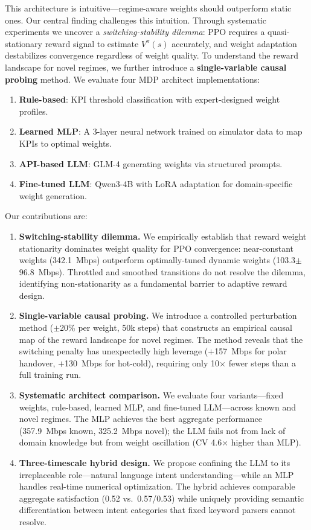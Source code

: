 \documentclass[conference]{IEEEtran}
\begin{document}
This architecture is intuitive---regime-aware weights should outperform static ones. Our central finding challenges this intuition. Through systematic experiments we uncover a \emph{switching-stability dilemma}: PPO requires a quasi-stationary reward signal to estimate $V^\pi(s)$ accurately, and weight adaptation destabilizes convergence regardless of weight quality. To understand the reward landscape for novel regimes, we further introduce a \textbf{single-variable causal probing} method. We evaluate four MDP architect implementations:
\begin{enumerate}
\item \textbf{Rule-based}: KPI threshold classification with expert-designed weight profiles.
\item \textbf{Learned MLP}: A 3-layer neural network trained on simulator data to map KPIs to optimal weights.
\item \textbf{API-based LLM}: GLM-4 generating weights via structured prompts.
\item \textbf{Fine-tuned LLM}: Qwen3-4B with LoRA adaptation for domain-specific weight generation.
\end{enumerate}

Our contributions are:
\begin{enumerate}
\item \textbf{Switching-stability dilemma.} We empirically establish that reward weight stationarity dominates weight quality for PPO convergence: near-constant weights (342.1~Mbps) outperform optimally-tuned dynamic weights (103.3$\pm$96.8~Mbps). Throttled and smoothed transitions do not resolve the dilemma, identifying non-stationarity as a fundamental barrier to adaptive reward design.
\item \textbf{Single-variable causal probing.} We introduce a controlled perturbation method ($\pm$20\% per weight, 50k steps) that constructs an empirical causal map of the reward landscape for novel regimes. The method reveals that the switching penalty has unexpectedly high leverage ($+$157~Mbps for polar handover, $+$130~Mbps for hot-cold), requiring only 10$\times$ fewer steps than a full training run.
\item \textbf{Systematic architect comparison.} We evaluate four variants---fixed weights, rule-based, learned MLP, and fine-tuned LLM---across known and novel regimes. The MLP achieves the best aggregate performance (357.9~Mbps known, 325.2~Mbps novel); the LLM fails not from lack of domain knowledge but from weight oscillation (CV 4.6$\times$ higher than MLP).
\item \textbf{Three-timescale hybrid design.} We propose confining the LLM to its irreplaceable role---natural language intent understanding---while an MLP handles real-time numerical optimization. The hybrid achieves comparable aggregate satisfaction (0.52 vs.\ 0.57/0.53) while uniquely providing semantic differentiation between intent categories that fixed keyword parsers cannot resolve.
\end{enumerate}
\end{document}
